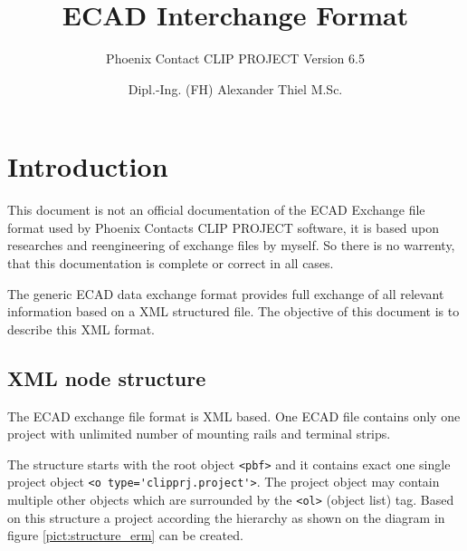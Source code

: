 \documentclass[%
	a4paper,
	oneside,
	listof=numbered,
	parskip=half,
	headsepline=true,
	footsepline=false,
	normalheadings,
	0.7headlines,
	headexclude,
	]{scrbook}
\begin{document}
\title{ECAD Interchange Format}
\subtitle{Phoenix Contact CLIP PROJECT Version 6.5}

\subject{ALX-Development}
\author{Dipl.-Ing. (FH) Alexander Thiel M.Sc.}


\maketitle
\tableofcontents

\chapter{Introduction}

This document is not an official documentation of the ECAD Exchange file format used by Phoenix Contacts
CLIP PROJECT software, it is based upon researches and reengineering of exchange files by myself. So there is no warrenty, that this documentation is complete or correct in all cases. 

The generic ECAD data exchange format provides full exchange of all relevant information based on a XML structured file. The objective of this document is to describe this XML format.

\section{XML node structure}

The ECAD exchange file format is XML based. One ECAD file contains only one project with unlimited number of mounting rails and terminal strips.

The structure starts with the root object \verb|<pbf>| and it contains exact one single project object \verb|<o type='clipprj.project'>|. The project object may contain multiple other objects which are surrounded by the \verb|<ol>| (object list) tag. Based on this structure a project according the hierarchy as shown on the diagram in figure \ref{pict:structure_erm} can be created.

\end{document}

